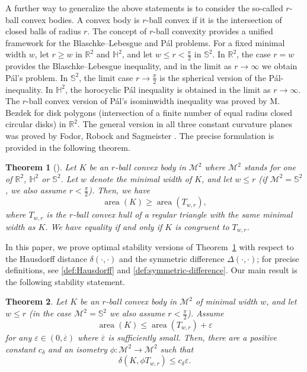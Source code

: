 \documentclass[12pt,reqno]{amsart}
\newtheorem{theorem}{Theorem}[section]
\theoremstyle{remark}
\newcommand{\R}{{\mathbb R}}
\newcommand{\hyp}{{\mathbb H}}
\newcommand{\sph}{{\mathbb S}}
\newcommand{\M}{\mathcal{M}}
\DeclareMathOperator{\area}{\mathrm{area}}
\begin{document}
A further way to generalize the above statements is to consider the so-called $r$-ball convex bodies. A convex body is $r$-ball convex if it is the intersection of closed balls of radius $r$. The concept of $r$-ball convexity provides a unified framework for the Blaschke--Lebesgue and P\'al problems. For a fixed minimal width $w$, let $r\geq w$ in $\R^2$ and $\hyp^2$, and let $w\leq r<\frac{\pi}{2}$ in $\sph^2$. In $\R^2$, the case $r=w$ provides the Blaschke--Lebesgue inequality, and in the limit as $r\to\infty$ we obtain P\'al's problem. In $\sph^2$, the limit case $r\to\frac{\pi}{2}$ is the spherical version of the P\'al-inequality. In $\hyp^2$, the horocyclic P\'al inequality is obtained in the limit as $r\to\infty$. The $r$-ball convex version of P\'al's isominwidth inequality was proved by M. Bezdek \cite{Bez09} for disk polygons (intersection of a finite number of equal radius closed circular disks) in $\R^2$. The general version in all three constant curvature planes was proved by Fodor, Robock and Sagmeister \cite{FRS26}. The precise formulation is provided in the following theorem.

\begin{theorem}[\cite{FRS26}]
\label{thm:isominwidth:spindleconvex}
Let $K$ be an $r$-ball convex body in $\M^2$ where $\M^2$ stands for one of $\R^2$, $\hyp^2$ or $\sph^2$. Let $w$ denote the minimal width of $K$, and let $w\leq r$ (if $\M^2=\sph^2$, we also assume $r<\frac{\pi}{2}$). Then, we have
$$
\area\left(K\right)\geq\area\left(T_{w,r}\right),
$$
where $T_{w,r}$ is the $r$-ball convex hull of a regular triangle with the same minimal width as $K$. We have equality if and only if $K$ is congruent to $T_{w,r}$.
\end{theorem}

In this paper, we prove optimal stability versions of Theorem~\ref{thm:isominwidth:spindleconvex} with respect to the Hausdorff distance $\delta(\cdot,\cdot)$ and the symmetric difference $\Delta(\cdot,\cdot)$; for precise definitions, see \eqref{def:Hausdorff} and \eqref{def:symmetric-difference}. Our main result is the following stability statement.

\begin{theorem}\label{thm:stab:isominwidth:spindleconvex}
Let $K$ be an $r$-ball convex body in $\M^2$ of minimal width $w$, and let $w\leq r$ (in the case $\M^2=\sph^2$ we also assume $r<\frac{\pi}{2}$). Assume
$$
\area\left(K\right)\leq\area\left(T_{w,r}\right)+\varepsilon
$$
for any $\varepsilon\in(0,\overline{\varepsilon})$ where $\overline{\varepsilon}$ is sufficiently small. Then, there are a positive constant $c_\delta$ and an isometry $\phi\colon\M^2\to\M^2$ such that
$$
\delta(K,\phi T_{w,r})\leq c_\delta\varepsilon.
$$
\end{theorem}
\end{document}
